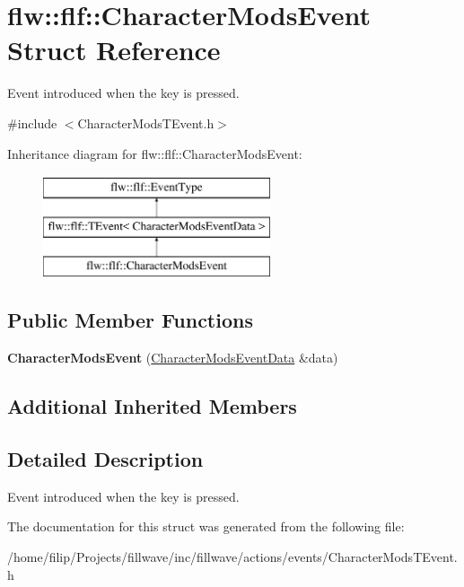 \hypertarget{classflw_1_1flf_1_1CharacterModsEvent}{}\section{flw\+:\+:flf\+:\+:Character\+Mods\+Event Struct Reference}
\label{classflw_1_1flf_1_1CharacterModsEvent}


Event introduced when the key is pressed.  




{\ttfamily \#include $<$Character\+Mods\+T\+Event.\+h$>$}

Inheritance diagram for flw\+:\+:flf\+:\+:Character\+Mods\+Event\+:\begin{figure}[H]
\begin{center}
\leavevmode
\includegraphics[height=3.000000cm]{classflw_1_1flf_1_1CharacterModsEvent}
\end{center}
\end{figure}
\subsection*{Public Member Functions}
\begin{DoxyCompactItemize}
\item 
{\bfseries Character\+Mods\+Event} (\hyperlink{structflw_1_1flf_1_1CharacterModsEventData}{Character\+Mods\+Event\+Data} \&data)\hypertarget{classflw_1_1flf_1_1CharacterModsEvent_a828d334f22e00b4435f9a5be0b705702}{}\label{classflw_1_1flf_1_1CharacterModsEvent_a828d334f22e00b4435f9a5be0b705702}

\end{DoxyCompactItemize}
\subsection*{Additional Inherited Members}


\subsection{Detailed Description}
Event introduced when the key is pressed. 

The documentation for this struct was generated from the following file\+:\begin{DoxyCompactItemize}
\item 
/home/filip/\+Projects/fillwave/inc/fillwave/actions/events/Character\+Mods\+T\+Event.\+h\end{DoxyCompactItemize}
